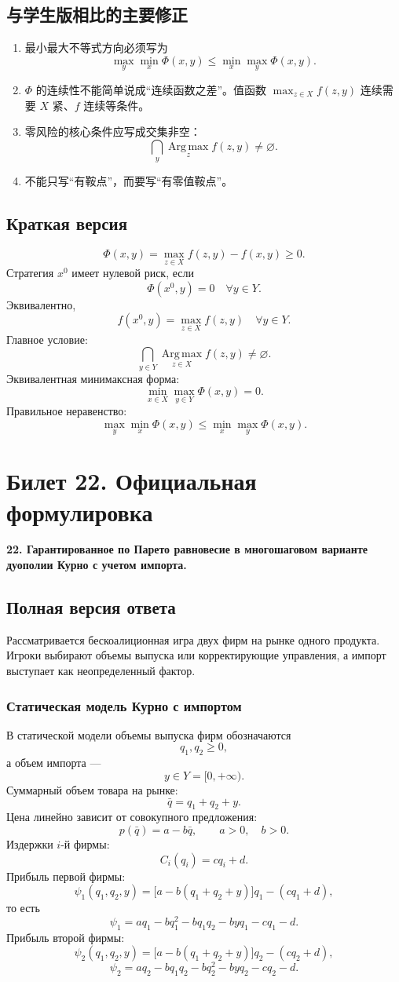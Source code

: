 \documentclass[12pt,a4paper]{article}
\newcommand{\Argmax}{\operatorname*{Arg\,max}}
\begin{document}
\subsection{与学生版相比的主要修正}
\begin{enumerate}
  \item 最小最大不等式方向必须写为
  \[
  \max_y\min_x\Phi(x,y)\le \min_x\max_y\Phi(x,y).
  \]
  \item $\Phi$ 的连续性不能简单说成“连续函数之差”。值函数 $\max_{z\in X}f(z,y)$ 连续需要 $X$ 紧、$f$ 连续等条件。
  \item 零风险的核心条件应写成交集非空：
  \[
  \bigcap_y\Argmax_z f(z,y)\ne\varnothing.
  \]
  \item 不能只写“有鞍点”，而要写“有零值鞍点”。
\end{enumerate}

\subsection{Краткая версия}
\[
\Phi(x,y)=\max_{z\in X}f(z,y)-f(x,y)\ge 0.
\]
Стратегия $x^0$ имеет нулевой риск, если
\[
\Phi(x^0,y)=0\quad \forall y\in Y.
\]
Эквивалентно,
\[
f(x^0,y)=\max_{z\in X}f(z,y)\quad \forall y\in Y.
\]
Главное условие:
\[
\bigcap_{y\in Y}\Argmax_{z\in X}f(z,y)\ne\varnothing.
\]
Эквивалентная минимаксная форма:
\[
\min_{x\in X}\max_{y\in Y}\Phi(x,y)=0.
\]
Правильное неравенство:
\[
\max_y\min_x\Phi(x,y)\le \min_x\max_y\Phi(x,y).
\]

\newpage
\section{Билет 22. Официальная формулировка}
\textbf{22. Гарантированное по Парето равновесие в многошаговом варианте дуополии Курно с учетом импорта.}

\subsection{Полная версия ответа}
Рассматривается бескоалиционная игра двух фирм на рынке одного продукта. Игроки выбирают объемы выпуска или корректирующие управления, а импорт выступает как неопределенный фактор.

\subsubsection{Статическая модель Курно с импортом}
В статической модели объемы выпуска фирм обозначаются
\[
q_1,q_2\ge 0,
\]
а объем импорта ---
\[
y\in Y=[0,+\infty).
\]
Суммарный объем товара на рынке:
\[
\bar q=q_1+q_2+y.
\]
Цена линейно зависит от совокупного предложения:
\[
p(\bar q)=a-b\bar q,
\qquad a>0,\quad b>0.
\]
Издержки $i$-й фирмы:
\[
C_i(q_i)=cq_i+d.
\]
Прибыль первой фирмы:
\[
\psi_1(q_1,q_2,y)=\bigl[a-b(q_1+q_2+y)\bigr]q_1-(cq_1+d),
\]
то есть
\[
\psi_1=aq_1-bq_1^2-bq_1q_2-byq_1-cq_1-d.
\]
Прибыль второй фирмы:
\[
\psi_2(q_1,q_2,y)=\bigl[a-b(q_1+q_2+y)\bigr]q_2-(cq_2+d),
\]
\[
\psi_2=aq_2-bq_1q_2-bq_2^2-byq_2-cq_2-d.
\]
\end{document}
